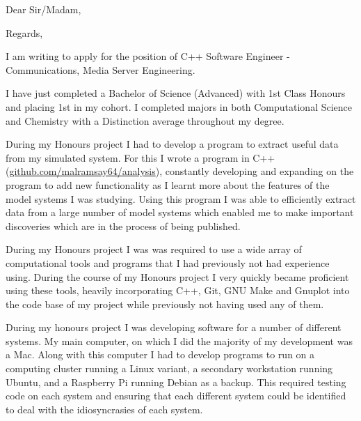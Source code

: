 


\recipient{~}{~}
\date{\today}
\opening{Dear Sir/Madam,}
\closing{Regards,}



\makelettertitle

I am writing to apply for the position of C++ Software Engineer - Communications, Media Server Engineering. 


I have just completed a Bachelor of Science (Advanced) with 1st Class Honours and placing 1st in my cohort. I completed majors in both Computational Science and Chemistry with a Distinction average throughout my degree.

During my Honours project I had to develop a program to extract useful data from my simulated system. For this I wrote a program in C++ (\href{http://github.com/malramsay64/analysis}{github.com/malramsay64/analysis}), constantly developing and expanding on the program to add new functionality as I learnt more about the features of the model systems I was studying. Using this program I was able to efficiently extract data from a large number of model systems which enabled me to make important discoveries which are in the process of being published.


During my Honours project I was was required to use a wide array of computational tools and programs that I had previously not had experience using. During the course of my Honours project I very quickly became proficient using these tools, heavily incorporating C++, Git, GNU Make and Gnuplot into the code base of my project while previously not having used any of them.



During my honours project I was developing software for a number of different systems. My main computer, on which I did the majority of my development was a Mac. Along with this computer I had to develop programs to run on a computing cluster running a Linux variant, a secondary workstation running Ubuntu, and a Raspberry Pi running Debian as a backup. This required testing code on each system and ensuring that each different system could be identified to deal with the idiosyncrasies of each system. 

